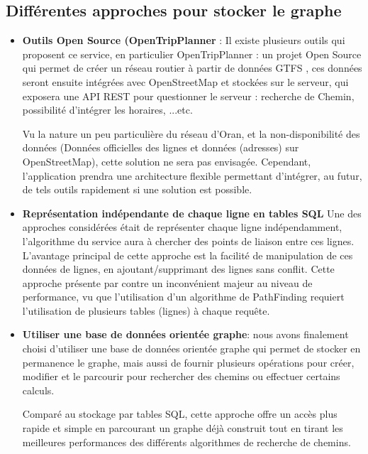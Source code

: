 \subsection{Différentes approches pour stocker le graphe}
\begin{itemize}
	\item \textbf{Outils Open Source (OpenTripPlanner} : 
	      Il existe plusieurs outils qui proposent ce service, en particulier OpenTripPlanner : un projet Open Source qui permet de créer un réseau routier à partir de données GTFS , ces données seront ensuite intégrées avec OpenStreetMap et stockées sur le serveur, qui exposera une API REST pour questionner le serveur : recherche de Chemin, possibilité d'intégrer les horaires, ...etc.
	      		
	      Vu la nature un peu particulière du réseau d'Oran, et la non-disponibilité des données (Données officielles des lignes et données (adresses) sur OpenStreetMap), cette solution ne sera pas envisagée. 
	      Cependant, l'application prendra une architecture flexible permettant d'intégrer, au futur, de tels outils rapidement si une solution est possible.
	\item \textbf{Représentation indépendante de chaque ligne en tables SQL}
	      Une des approches considérées était de représenter chaque ligne indépendamment, l'algorithme du service aura à chercher des points de liaison entre ces lignes.
	      L'avantage principal de cette approche est la facilité de manipulation de ces données de lignes, en ajoutant/supprimant des lignes sans conflit.
	      Cette approche présente par contre un inconvénient majeur au niveau de performance, vu que l'utilisation d'un algorithme de PathFinding requiert l'utilisation de plusieurs tables (lignes) à chaque requête.
	      
	\item \textbf{Utiliser une base de données orientée graphe}: nous avons finalement choisi d'utiliser une base de données orientée graphe qui permet de stocker en permanence le graphe, mais aussi de fournir plusieurs opérations pour créer, modifier et le parcourir pour rechercher des chemins ou effectuer certains calculs.
	
Comparé au stockage par tables SQL, cette approche offre un accès plus rapide et simple en parcourant un graphe déjà construit tout en tirant les meilleures performances des différents algorithmes de recherche de chemins.


\end{itemize}
